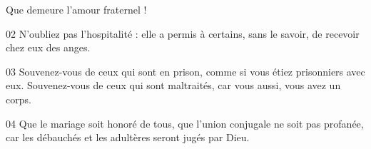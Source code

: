 Que demeure l’amour fraternel !

02 N’oubliez pas l’hospitalité : elle a permis à certains, sans le savoir, de recevoir chez eux des anges.

03 Souvenez-vous de ceux qui sont en prison, comme si vous étiez prisonniers avec eux. Souvenez-vous de ceux qui sont maltraités, car vous aussi, vous avez un corps.

04 Que le mariage soit honoré de tous, que l’union conjugale ne soit pas profanée, car les débauchés et les adultères seront jugés par Dieu.
